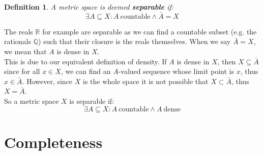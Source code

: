 \documentclass{article}
\newtheorem{defn}{Definition}[section]
\begin{document}
\medskip
\begin{defn}
A metric space is deemed \textbf{separable} if:
\begin{equation*}
    \exists A \subseteq X: A \ \text{countable} \land \bar{A} = X
\end{equation*}
\end{defn}
The reals $\mathbb{R}$ for example are separable as we can find a countable subset (e.g. the rationals $\mathbb{Q}$) such that their closure is the reals themselves. When we say $\bar{A} = X$, we mean that $A$ is dense in $X$.\\

This is due to our equivalent definition of density. If $A$ is dense in $X$, then $X \subseteq \bar{A}$ since for all $x \in X$, we can find an $A$-valued sequence whose limit point is $x$, thus $x \in \bar{A}$. However, since $X$ is the whole space it is not possible that $X \subset \bar{A}$, thus $X = \bar{A}$.\\

So a metric space $X$ is separable if:
\begin{equation*}
    \exists A \subseteq X: A \ \text{countable} \land A \ \text{dense}
\end{equation*}

\pagebreak
\section{Completeness}
\end{document}
